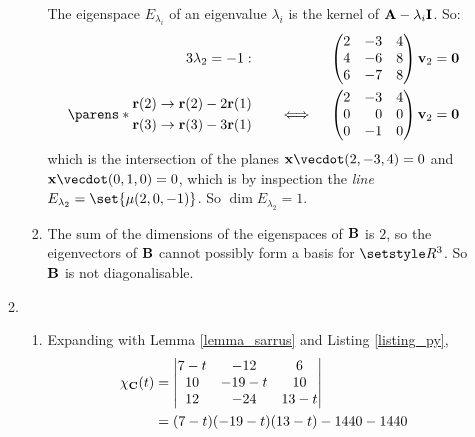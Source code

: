 \documentclass[fleqn,a4paper,11pt]{article}
\begin{document}
\begin{enumerate}[label=\textbf{\arabic*.}]
\begin{enumerate}[label=(\textbf{\Alph*})]
\begin{enumerate}[label=(\roman*)]
       The eigenspace \(E_{\lambda_i}\) of an eigenvalue
       \(\lambda_i\) is the kernel of \(\mathbf{A} - \lambda_i \mathbf{I}\). So:
       \begin{alignat*}3
        \lambda_2 = -1:\quad
        && &&\begin{pmatrix*}[r]
         2 & -3 & 4 \\
         4 & -6 & 8 \\
         6 & -7 & 8
        \end{pmatrix*}
        \vec v_2 &= \vec 0 \\
        \parens*{
         \begin{aligned}
          \vec r(2) &\to \vec r(2) - 2 \vec r(1) \\
          \vec r(3) &\to \vec r(3) - 3 \vec r(1)
         \end{aligned}
        } \quad
        &&\iff{}&&\begin{pmatrix*}[r]
         2 & -3 & 4 \\
         0 & 0 & 0 \\
         0 & -1 & 0
        \end{pmatrix*}
        \vec v_2 &= \vec 0 \\
       \end{alignat*}
       which is the intersection of the planes
       \(\vec x \vecdot (2, -3, 4) = 0\) and
       \(\vec x \vecdot (0, 1, 0) = 0\), which is by inspection the \emph{line}
       \(E_{\lambda_2} = \set{\mu(2, 0, -1)}\). So
       \(\dim E_{\lambda_2} = 1\).
      \item
       The sum of the dimensions of the eigenspaces of \(\mathbf{B}\) is \(2\), so
       the eigenvectors of \(\mathbf{B}\) cannot possibly form a basis for
       \(\Reals^3\). So \(\mathbf{B}\) is not diagonalisable.
     \end{enumerate}
    \item
     \begin{enumerate}[label=(\roman*)]
      \item
       Expanding with Lemma \ref{lemma_sarrus} and
       Listing \ref{listing_py},
       \begin{align*}
        \chi_{\mat C}(t)
         &= \begin{vmatrix}
          7 - t & -12 & 6 \\
          10 & -19 - t & 10 \\
          12 & -24 & 13 - t
         \end{vmatrix} \\
         &= (7 - t)(-19 - t)(13 - t) - 1440 - 1440 \\

\end{align*}
\end{enumerate}
\end{enumerate}
\end{enumerate}
\end{document}
